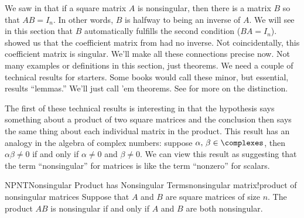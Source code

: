 %
We saw in  that if a square matrix $A$ is nonsingular, then there is a matrix $B$ so that $AB=I_n$.  In other words, $B$ is halfway to being an inverse of $A$.  We will see in this section that $B$ automatically fulfills the second condition ($BA=I_n$).   showed us that the coefficient matrix from  had no inverse.  Not coincidentally, this coefficient matrix is singular.  We'll make all these connections precise now.  Not many examples or definitions in this section, just theorems.
%
%
We need a couple of technical results for starters.  Some books would call these minor, but essential, results ``lemmas.''  We'll just call 'em theorems.  
{\relax}
{See  for more on the distinction.}\par
%
The first of these technical results is interesting in that the hypothesis says something about a product of two square matrices and the conclusion then says the same thing about each individual matrix in the product.  This result has an analogy in the algebra of complex numbers: suppose $\alpha,\,\beta\in\complexes$, then $\alpha\beta\neq 0$ if and only if $\alpha\neq 0$ and $\beta\neq 0$.  We can view this result as suggesting that the term ``nonsingular'' for matrices is like the term ``nonzero'' for scalars.
%
\begin{theorem}{NPNT}{Nonsingular Product has Nonsingular Terms}{nonsingular matrix!product of nonsingular matrices}
%
Suppose that $A$ and $B$ are square matrices of size $n$.  The product $AB$ is nonsingular if and only if $A$ and $B$ are both nonsingular.
\end{theorem}
%
